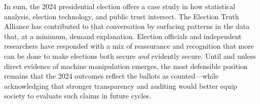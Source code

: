 \documentclass[12pt]{article}
\begin{document}
In sum, the 2024 presidential election offers a case study in how statistical analysis, election technology, and public trust intersect. The Election Truth Alliance has contributed to that conversation by surfacing patterns in the data that, at a minimum, demand explanation. Election officials and independent researchers have responded with a mix of reassurance and recognition that more can be done to make elections both secure \emph{and} evidently secure. Until and unless direct evidence of machine manipulation emerges, the most defensible position remains that the 2024 outcomes reflect the ballots as counted---while acknowledging that stronger transparency and auditing would better equip society to evaluate such claims in future cycles.
\end{document}
